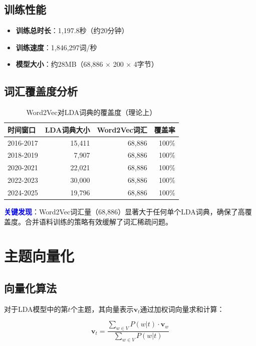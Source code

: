 \documentclass[11pt,a4paper]{article}
\begin{document}
\subsection{训练性能}

\begin{itemize}
    \item \textbf{训练总时长}：1,197.8秒（约20分钟）
    \item \textbf{训练速度}：1,846,297词/秒
    \item \textbf{模型大小}：约28MB（68,886 × 200 × 4字节）
\end{itemize}

\subsection{词汇覆盖度分析}

\begin{table}[h]
\centering
\begin{tabular}{lrrr}
\toprule
\textbf{时间窗口} & \textbf{LDA词典大小} & \textbf{Word2Vec词汇} & \textbf{覆盖率} \\
\midrule
2016-2017 & 15,411 & 68,886 & 100\% \\
2018-2019 & 7,907 & 68,886 & 100\% \\
2020-2021 & 22,021 & 68,886 & 100\% \\
2022-2023 & 30,000 & 68,886 & 100\% \\
2024-2025 & 19,796 & 68,886 & 100\% \\
\bottomrule
\end{tabular}
\caption{Word2Vec对LDA词典的覆盖度（理论上）}
\end{table}

\textcolor{blue}{\textbf{关键发现}}：Word2Vec词汇量（68,886）显著大于任何单个LDA词典，确保了高覆盖度。合并语料训练的策略有效缓解了词汇稀疏问题。

\section{主题向量化}

\subsection{向量化算法}

对于LDA模型中的第$t$个主题，其向量表示$\mathbf{v}_t$通过加权词向量求和计算：

\begin{equation}
\mathbf{v}_t = \frac{\sum_{w \in V} P(w|t) \cdot \mathbf{v}_w}{\sum_{w \in V} P(w|t)}
\end{equation}
\end{document}
